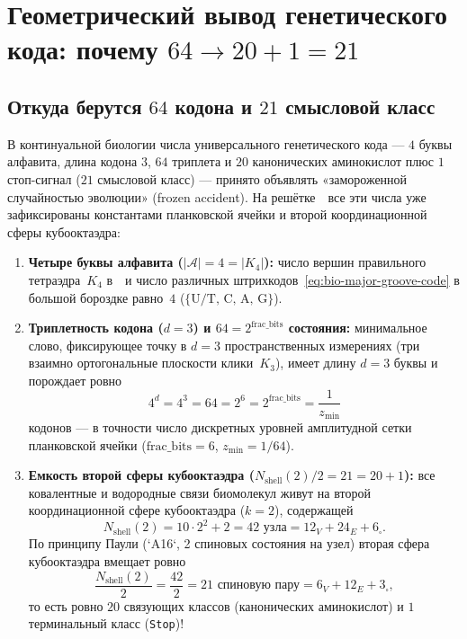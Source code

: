 \chapter{Геометрический вывод генетического кода: почему \texorpdfstring{$64\to 20+1=21$}{64 -> 20+1=21}}
\label{ch:bio-genetic-code}

\section{Откуда берутся \texorpdfstring{$64$}{64} кодона и \texorpdfstring{$21$}{21} смысловой класс}
\label{sec:bio-64-to-21}

В континуальной биологии числа универсального генетического кода --- $4$ буквы алфавита, длина кодона $3$, $64$ триплета и $20$ канонических аминокислот плюс $1$ стоп-сигнал ($21$ смысловой класс) --- принято объявлять «замороженной случайностью эволюции» (frozen accident).
На решётке~\latGCKshort\ все эти числа уже зафиксированы константами планковской ячейки и второй координационной сферы кубооктаэдра:
\begin{enumerate}[leftmargin=*]
\item \textbf{Четыре буквы алфавита ($|\mathcal{A}|=4=|K_4|$):}
  число вершин правильного тетраэдра~$K_4$ в~\latGCKshort\ и число различных штрихкодов~\eqref{eq:bio-major-groove-code} в большой бороздке равно~$4$ ($\{\text{U/T, C, A, G}\}$).
\item \textbf{Триплетность кодона ($d=3$) и $64=2^{\mathrm{frac\_bits}}$ состояния:}
  минимальное слово, фиксирующее точку в $d=3$ пространственных измерениях (три взаимно ортогональные плоскости клики~$K_3$), имеет длину $d=3$ буквы и порождает ровно
  \[
    4^d = 4^3 = 64 = 2^6 = 2^{\mathrm{frac\_bits}} = \frac{1}{z_{\min}}
  \]
  кодонов --- в точности число дискретных уровней амплитудной сетки планковской ячейки ($\mathrm{frac\_bits}=6$, $z_{\min}=1/64$).
\item \textbf{Емкость второй сферы кубооктаэдра ($N_{\mathrm{shell}}(2)/2 = 21 = 20 + 1$):}
  все ковалентные и водородные связи биомолекул живут на второй координационной сфере кубооктаэдра ($k=2$), содержащей
  \[
    N_{\mathrm{shell}}(2) = 10\cdot 2^2 + 2 = 42\text{ узла} = 12_V + 24_E + 6_\square.
  \]
  По принципу Паули (`A16`, 2 спиновых состояния на узел) вторая сфера кубооктаэдра вмещает ровно
  \begin{equation}
  \label{eq:bio-21-classes}
    \frac{N_{\mathrm{shell}}(2)}{2}
    = \frac{42}{2}
    = 21\text{ спиновую пару}
    = 6_V + 12_E + 3_\square,
  \end{equation}
  то есть ровно $20$ связующих классов (канонических аминокислот) и $1$ терминальный класс (\texttt{Stop})!
\end{enumerate}

